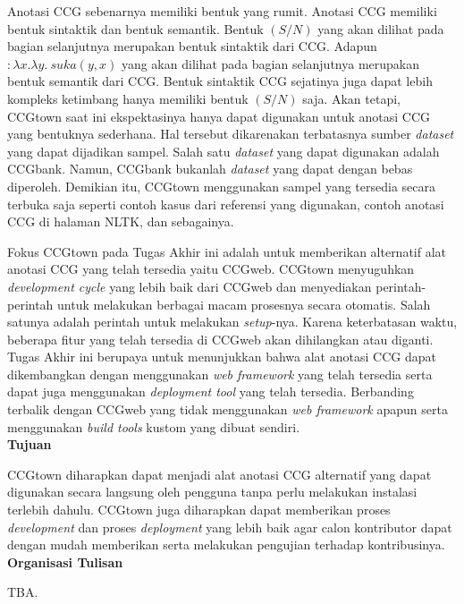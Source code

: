 Anotasi CCG sebenarnya memiliki bentuk yang rumit. Anotasi CCG memiliki bentuk sintaktik dan
bentuk semantik. Bentuk $(S/N)$ yang akan dilihat pada bagian selanjutnya merupakan bentuk sintaktik
dari CCG. Adapun $: \lambda x.\lambda y.\ suka(y, x)$ yang akan dilihat pada bagian selanjutnya
merupakan bentuk semantik dari CCG. Bentuk sintaktik CCG sejatinya juga dapat lebih kompleks
ketimbang hanya memiliki bentuk $(S/N)$ saja. Akan tetapi, CCGtown saat ini ekspektasinya hanya
dapat digunakan untuk anotasi CCG yang bentuknya sederhana. Hal tersebut dikarenakan terbatasnya
sumber \textit{dataset} yang dapat dijadikan sampel. Salah satu \textit{dataset} yang dapat digunakan
adalah CCGbank. Namun, CCGbank bukanlah \textit{dataset} yang dapat dengan bebas diperoleh.
Demikian itu, CCGtown menggunakan sampel yang tersedia secara terbuka saja seperti contoh kasus
dari referensi yang digunakan, contoh anotasi CCG di halaman NLTK, dan sebagainya.

Fokus CCGtown pada Tugas Akhir ini adalah untuk memberikan alternatif alat anotasi CCG yang telah
tersedia yaitu CCGweb. CCGtown menyuguhkan \textit{development cycle} yang lebih baik dari CCGweb
dan menyediakan perintah-perintah untuk melakukan berbagai macam prosesnya secara otomatis.
Salah satunya adalah perintah untuk melakukan \textit{setup}-nya. Karena keterbatasan waktu,
beberapa fitur yang telah tersedia di CCGweb akan dihilangkan atau diganti. Tugas Akhir ini
berupaya untuk menunjukkan bahwa alat anotasi CCG dapat dikembangkan dengan menggunakan
\textit{web framework} yang telah tersedia serta dapat juga menggunakan \textit{deployment tool}
yang telah tersedia. Berbanding terbalik dengan CCGweb yang tidak menggunakan \textit{web framework}
apapun serta menggunakan \textit{build tools} kustom yang dibuat sendiri.
\\


\noindent\textbf{Tujuan}

CCGtown diharapkan dapat menjadi alat anotasi CCG alternatif yang dapat digunakan secara langsung
oleh pengguna tanpa perlu melakukan instalasi terlebih dahulu. CCGtown juga diharapkan dapat
memberikan proses \textit{development} dan proses \textit{deployment} yang lebih baik agar calon
kontributor dapat dengan mudah memberikan serta melakukan pengujian terhadap kontribusinya.
\\


\noindent \textbf{Organisasi Tulisan}

TBA.



